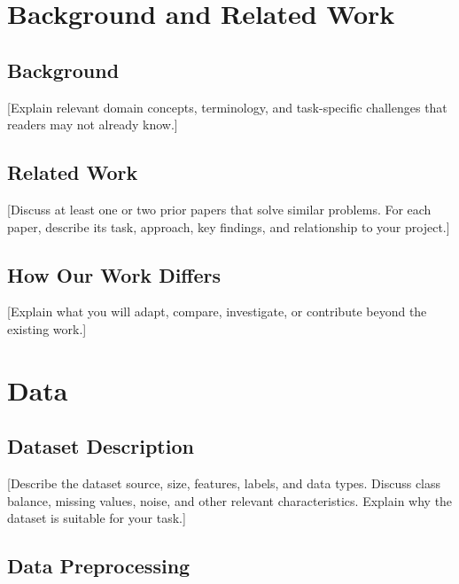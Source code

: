 \documentclass{article}
\begin{document}
\section{Background and Related Work}


\subsection{Background}

[Explain relevant domain concepts, terminology, and task-specific
challenges that readers may not already know.]

\subsection{Related Work}

[Discuss at least one or two prior papers that solve similar problems.
For each paper, describe its task, approach, key findings, and
relationship to your project.]

\subsection{How Our Work Differs}

[Explain what you will adapt, compare, investigate, or contribute
beyond the existing work.]


\section{Data}

\subsection{Dataset Description}

[Describe the dataset source, size, features, labels, and data types.
Discuss class balance, missing values, noise, and other relevant
characteristics. Explain why the dataset is suitable for your task.]

\subsection{Data Preprocessing}
\end{document}
